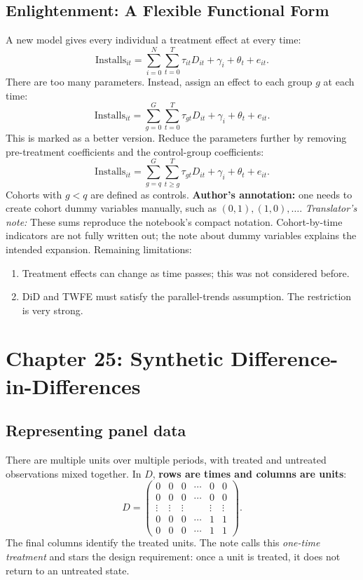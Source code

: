 \subsection{Enlightenment: A Flexible Functional Form}
A new model gives every individual a treatment effect at every time:
\[
\mathrm{Installs}_{it}
 =\sum_{i=0}^{N}\sum_{t=0}^{T}\tau_{it}D_{it}+\gamma_i+\theta_t+e_{it}.
\]
There are too many parameters. Instead, assign an effect to each group \(g\) at each time:
\[
\mathrm{Installs}_{it}
 =\sum_{g=0}^{G}\sum_{t=0}^{T}\tau_{gt}D_{it}+\gamma_i+\theta_t+e_{it}.
\]
This is marked as a better version. Reduce the parameters further by removing pre-treatment coefficients and the control-group coefficients:
\[
\mathrm{Installs}_{it}
 =\sum_{g=q}^{G}\sum_{t\geq g}^{T}\tau_{gt}D_{it}+\gamma_i+\theta_t+e_{it}.
\]
Cohorts with \(g<q\) are defined as controls. \textbf{Author's annotation:} one needs to create cohort dummy variables manually, such as \((0,1),(1,0),\ldots\).
\textit{Translator's note:} These sums reproduce the notebook's compact notation. Cohort-by-time indicators are not fully written out; the note about dummy variables explains the intended expansion.
Remaining limitations:
\begin{enumerate}
\item Treatment effects can change as time passes; this was not considered before.
\item DiD and TWFE must satisfy the parallel-trends assumption. The restriction is very strong.
\end{enumerate}

\section{Chapter 25: Synthetic Difference-in-Differences}
\subsection{Representing panel data}
There are multiple units over multiple periods, with treated and untreated observations mixed together. In \(D\), \textbf{rows are times and columns are units}:
\[
D=\begin{pmatrix}
0&0&0&\cdots&0&0\\
0&0&0&\cdots&0&0\\
\vdots&\vdots&\vdots&&\vdots&\vdots\\
0&0&0&\cdots&1&1\\
0&0&0&\cdots&1&1
\end{pmatrix}.
\]
The final columns identify the treated units. The note calls this \emph{one-time treatment} and stars the design requirement: once a unit is treated, it does not return to an untreated state.

